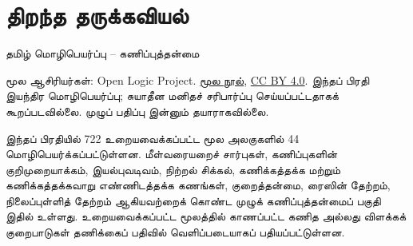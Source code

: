\documentclass[11pt,a4paper,openany]{memoir}
\begin{document}
\raggedright
\pagestyle{plain}
\chapter*{திறந்த தருக்கவியல்}
\noindent தமிழ் மொழிபெயர்ப்பு -- கணிப்புத்தன்மை

\noindent மூல ஆசிரியர்கள்: Open Logic Project.
\href{https://github.com/OpenLogicProject/OpenLogic}{மூல நூல்},
\href{https://creativecommons.org/licenses/by/4.0/}{CC BY 4.0}.
இந்தப் பிரதி இயந்திர மொழிபெயர்ப்பு; சுயாதீன மனிதச் சரிபார்ப்பு செய்யப்பட்டதாகக்
கூறப்படவில்லை. முழுப் பதிப்பு இன்னும் தயாராகவில்லை.

\noindent இந்தப் பிரதியில் 722 உறையவைக்கப்பட்ட மூல அலகுகளில் 44
மொழிபெயர்க்கப்பட்டுள்ளன. மீள்வரையறைச் சார்புகள், கணிப்புகளின்
குறிமுறையாக்கம், இயல்புவடிவம், நிற்றல் சிக்கல், கணிக்கத்தக்க மற்றும்
கணிக்கத்தக்கவாறு எண்ணிடத்தக்க கணங்கள், குறைத்தன்மை, ரைஸின் தேற்றம்,
நிலைப்புள்ளித் தேற்றம் ஆகியவற்றைக் கொண்ட முழுக் கணிப்புத்தன்மைப்
பகுதி இதில் உள்ளது. உறையவைக்கப்பட்ட மூலத்தில் காணப்பட்ட கணித அல்லது
விளக்கக் குறைபாடுகள் தணிக்கைப் பதிவில் வெளிப்படையாகப் பதியப்பட்டுள்ளன.

\clearpage
\tableofcontents*

\end{document}
